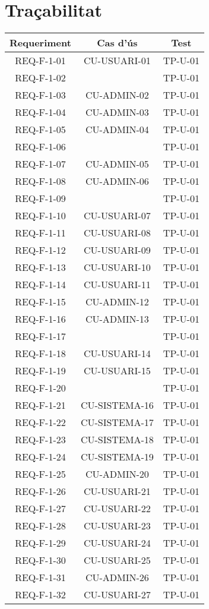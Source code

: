 \section{Traçabilitat}\label{sec:intro}

\begin{center}
\begin{tabular}{|c|c|c|}
\hline
{\cellcolor[gray]{.8} \bf Requeriment} & {\cellcolor[gray]{.8} \bf Cas d'ús} & {\cellcolor[gray]{.8} \bf Test}  \\
\hline
REQ-F-1-01 & CU-USUARI-01 & TP-U-01 \\
\hline
REQ-F-1-02 &  & TP-U-01 \\
\hline
REQ-F-1-03 & CU-ADMIN-02 & TP-U-01 \\
\hline
REQ-F-1-04 & CU-ADMIN-03 & TP-U-01 \\
\hline
REQ-F-1-05 & CU-ADMIN-04 & TP-U-01 \\
\hline
REQ-F-1-06 &  & TP-U-01 \\
\hline
REQ-F-1-07 & CU-ADMIN-05 & TP-U-01 \\
\hline
REQ-F-1-08 & CU-ADMIN-06 & TP-U-01 \\
\hline
REQ-F-1-09 &  & TP-U-01 \\
\hline
REQ-F-1-10 & CU-USUARI-07 & TP-U-01 \\
\hline
REQ-F-1-11 & CU-USUARI-08 & TP-U-01 \\
\hline
REQ-F-1-12 & CU-USUARI-09 & TP-U-01 \\
\hline
REQ-F-1-13 & CU-USUARI-10 & TP-U-01 \\
\hline
REQ-F-1-14 & CU-USUARI-11 & TP-U-01 \\
\hline
REQ-F-1-15 & CU-ADMIN-12 & TP-U-01 \\
\hline
REQ-F-1-16 & CU-ADMIN-13 & TP-U-01 \\
\hline
REQ-F-1-17 &  & TP-U-01 \\
\hline
REQ-F-1-18 & CU-USUARI-14 & TP-U-01 \\
\hline
REQ-F-1-19 & CU-USUARI-15 & TP-U-01 \\
\hline
REQ-F-1-20 &  & TP-U-01 \\
\hline
REQ-F-1-21 & CU-SISTEMA-16 & TP-U-01 \\
\hline
REQ-F-1-22 & CU-SISTEMA-17 & TP-U-01 \\
\hline
REQ-F-1-23 & CU-SISTEMA-18 & TP-U-01 \\
\hline
REQ-F-1-24 & CU-SISTEMA-19 & TP-U-01 \\
\hline
REQ-F-1-25 & CU-ADMIN-20 & TP-U-01 \\
\hline
REQ-F-1-26 & CU-USUARI-21 & TP-U-01 \\
\hline
REQ-F-1-27 & CU-USUARI-22 & TP-U-01 \\
\hline
REQ-F-1-28 & CU-USUARI-23 & TP-U-01 \\
\hline
REQ-F-1-29 & CU-USUARI-24 & TP-U-01 \\
\hline
REQ-F-1-30 & CU-USUARI-25 & TP-U-01 \\
\hline
REQ-F-1-31 & CU-ADMIN-26 & TP-U-01 \\
\hline
REQ-F-1-32 & CU-USUARI-27 & TP-U-01 \\
\hline

\end{tabular}
\end{center}
